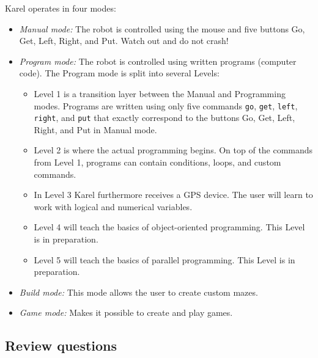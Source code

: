 \documentclass[article,A4,12pt]{llncs}
\begin{document}
Karel operates in four modes:
\begin{itemize}
\item {\em Manual mode:} The robot is controlled using the mouse and five buttons Go, Get, Left, Right, and Put. 
      Watch out and do not crash!
\item {\em Program mode:} The robot is controlled using written programs (computer code). The Program mode is 
      split into several Levels:
\begin{itemize}
\item Level 1 is a transition layer between the Manual and Programming modes. Programs are written using only 
      five commands {\tt go}, {\tt get}, {\tt left}, {\tt right}, and {\tt put} that exactly correspond to 
      the buttons Go, Get, Left, Right, and Put in Manual mode.
\item Level 2 is where the actual programming begins. On top of the commands from Level 1, programs can contain 
      conditions, loops, and custom commands.
\item In Level 3 Karel furthermore receives a GPS device. The user will learn to work with logical 
      and numerical variables. 
\item Level 4 will teach the basics of object-oriented programming. This Level is in preparation.
\item Level 5 will teach the basics of parallel programming. This Level is in preparation.
\end{itemize}
\item {\em Build mode:} This mode allows the user to create custom mazes.
\item {\em Game mode:} Makes it possible to create and play games. 
\end{itemize}

\subsection{Review questions}
\end{document}
